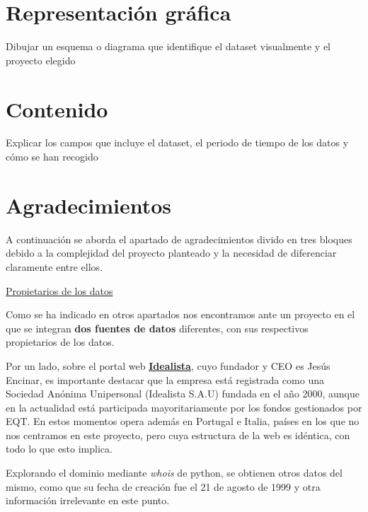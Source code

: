 \documentclass[12pt]{article}
\begin{document}
\vspace{-1.5em}\section{Representación gráfica}\vspace{-1.5em}

Dibujar un esquema o diagrama que identifique el
dataset visualmente y el proyecto elegido

\vspace{-1.5em}\section{Contenido}\vspace{-1.5em}

Explicar los campos que incluye el dataset, el periodo de tiempo de los datos y cómo se han recogido

\vspace{-1.5em}\section{Agradecimientos }\vspace{-1.5em}

A continuación se aborda el apartado de agradecimientos divido en tres bloques debido a la complejidad del proyecto planteado y la necesidad de diferenciar claramente entre ellos.

\underline{Propietarios de los datos}

Como se ha indicado en otros apartados nos encontramos ante un proyecto en el que se integran \textbf{dos fuentes de datos} diferentes, con sus respectivos propietarios de los datos. 

Por un lado, sobre el portal web \href{http://www.idealista.com}{\textbf{\underline{Idealista}}}, cuyo fundador y CEO es Jesús Encinar, es importante destacar que la empresa está registrada como una Sociedad Anónima Unipersonal (Idealista S.A.U) fundada en el año 2000, aunque en la actualidad está participada mayoritariamente por los fondos gestionados por EQT. En estos momentos opera además en Portugal e Italia, países en los que no nos centramos en este proyecto, pero cuya estructura de la web es idéntica, con todo lo que esto implica. 

Explorando el dominio mediante \textit{whois} de python, se obtienen otros datos del mismo, como que su fecha de creación fue el 21 de agosto de 1999 y otra información irrelevante en este punto. 
\end{document}
